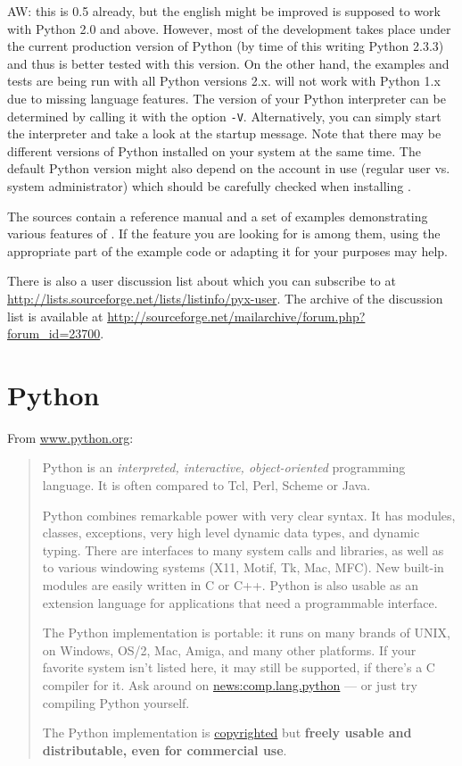 \documentclass[11pt,DIV14]{scrartcl}
\begin{document}
{AW: this is 0.5 already, but the english might be improved}
{\PyX{} is supposed to work with Python 2.0 and above. However, most of the
development takes place under the current production version of Python (by time of
this writing Python 2.3.3) and thus \PyX{} is better tested with this version. On the
other hand, the examples and tests are being run with all Python
versions 2.x. \PyX{} will not work with Python 1.x
due to missing language features. The version of your Python
interpreter can be determined by calling it with the option
\texttt{-V}. Alternatively, you can simply start the interpreter and
take a look at the startup message. Note that there may be different
versions of Python installed on your system at the same time. The
default Python version might also depend on the account in use
(regular user vs. system administrator) which should be carefully
checked when installing \PyX.
}

{}
{The \PyX{} sources contain a reference manual and a set of examples 
demonstrating various features of \PyX. If the feature you are looking for is
among them, using the appropriate part of the example code or adapting it for
your purposes may help.

There is also a user discussion list about \PyX{} which you can subscribe to
at \url{http://lists.sourceforge.net/lists/listinfo/pyx-user}. The archive of
the discussion list is available at \url{http://sourceforge.net/mailarchive/forum.php?forum_id=23700}.
}

\section{Python}

{}
{\label{q:what_is_python}
From \url{www.python.org}:
\begin{quote}
Python is an \textit{interpreted, interactive, object-oriented} programming 
language. It is often compared to Tcl, Perl, Scheme or Java.

Python combines remarkable power with very clear syntax. It has modules, 
classes, exceptions, very high level dynamic data types, and dynamic typing. 
There are interfaces to many system calls and libraries, as well as to various 
windowing systems (X11, Motif, Tk, Mac, MFC). New built-in modules are easily 
written in C or C++. Python is also usable as an extension language for 
applications that need a programmable interface.

The Python implementation is portable: it runs on many brands of UNIX, on 
Windows, OS/2, Mac, Amiga, and many other platforms. If your favorite system 
isn't listed here, it may still be supported, if there's a C compiler for it. 
Ask around on \href{news:comp.lang.python}{news:comp.lang.python} --- or just 
try compiling Python yourself.

The Python implementation is 
\href{http://www.python.org/doc/Copyright.html}{copyrighted} 
but \textbf{freely usable and distributable, even for commercial use}.
\end{quote}
}
\end{document}
